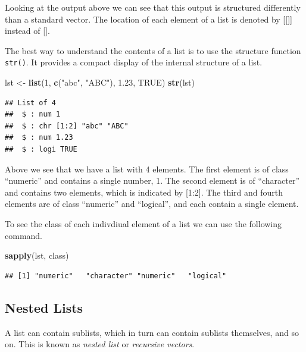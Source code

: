 \documentclass[
]{book}
\newenvironment{Shaded}{\begin{snugshade}}{\end{snugshade}}
\newcommand{\DecValTok}[1]{\textcolor[rgb]{0.00,0.00,0.81}{#1}}
\newcommand{\FloatTok}[1]{\textcolor[rgb]{0.00,0.00,0.81}{#1}}
\newcommand{\KeywordTok}[1]{\textcolor[rgb]{0.13,0.29,0.53}{\textbf{#1}}}
\newcommand{\NormalTok}[1]{#1}
\newcommand{\OtherTok}[1]{\textcolor[rgb]{0.56,0.35,0.01}{#1}}
\newcommand{\StringTok}[1]{\textcolor[rgb]{0.31,0.60,0.02}{#1}}
\begin{document}
Looking at the output above we can see that this output is structured differently than a standard vector. The location of each element of a list is denoted by {[}{[}{]}{]} instead of {[}{]}.

The best way to understand the contents of a list is to use the structure function \texttt{str()}. It provides a compact display of the internal structure of a list.

\begin{Shaded}
\begin{Highlighting}[]
\NormalTok{lst <-}\StringTok{ }\KeywordTok{list}\NormalTok{(}\DecValTok{1}\NormalTok{, }\KeywordTok{c}\NormalTok{(}\StringTok{"abc"}\NormalTok{, }\StringTok{"ABC"}\NormalTok{), }\FloatTok{1.23}\NormalTok{, }\OtherTok{TRUE}\NormalTok{)}
\KeywordTok{str}\NormalTok{(lst)}
\end{Highlighting}
\end{Shaded}

\begin{verbatim}
## List of 4
##  $ : num 1
##  $ : chr [1:2] "abc" "ABC"
##  $ : num 1.23
##  $ : logi TRUE
\end{verbatim}

Above we see that we have a list with 4 elements. The first element is of class ``numeric'' and contains a single number, 1. The second element is of ``character'' and contains two elements, which is indicated by {[}1:2{]}. The third and fourth elements are of class ``numeric'' and ``logical'', and each contain a single element.

To see the class of each indivdiual element of a list we can use the following command.

\begin{Shaded}
\begin{Highlighting}[]
\KeywordTok{sapply}\NormalTok{(lst, class)}
\end{Highlighting}
\end{Shaded}

\begin{verbatim}
## [1] "numeric"   "character" "numeric"   "logical"
\end{verbatim}

\hypertarget{nested-lists}{%
\subsection{Nested Lists}\label{nested-lists}}

A list can contain sublists, which in turn can contain sublists themselves, and so on. This is known as \emph{nested list} or \emph{recursive vectors}.
\end{document}
